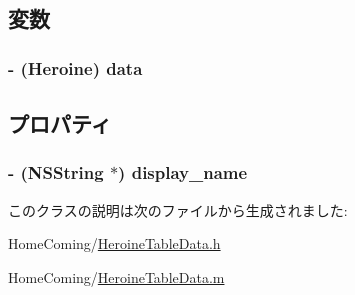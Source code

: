 \subsection{変数}
\hypertarget{interface_heroine_table_data_a015f516b3cb364ce0241d41c916cb635}{
\subsubsection[{data}]{\setlength{\rightskip}{0pt plus 5cm}-\/ ({\bf Heroine}) {\bf data}}}\label{interface_heroine_table_data_a015f516b3cb364ce0241d41c916cb635}


\subsection{プロパティ}
\hypertarget{interface_heroine_table_data_aad898ba45388237fc9d124cff49e7ca6}{
\subsubsection[{display\-\_\-name}]{\setlength{\rightskip}{0pt plus 5cm}-\/ (N\-S\-String $\ast$) {\bf display\-\_\-name}}}\label{interface_heroine_table_data_aad898ba45388237fc9d124cff49e7ca6}


このクラスの説明は次のファイルから生成されました\-:\begin{DoxyCompactItemize}
\item 
Home\-Coming/\hyperlink{_heroine_table_data_8h}{Heroine\-Table\-Data.\-h}\item 
Home\-Coming/\hyperlink{_heroine_table_data_8m}{Heroine\-Table\-Data.\-m}\end{DoxyCompactItemize}
